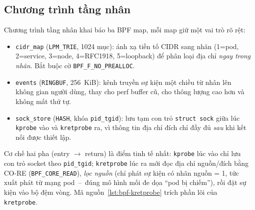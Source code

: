 \subsection{Chương trình tầng nhân}
\label{subsec:impl-kern}

Chương trình tầng nhân khai báo ba BPF map, mỗi map giữ một vai trò rõ rệt:

\begin{itemize}[leftmargin=1.4em]
  \item \texttt{cidr\_map} (\texttt{LPM\_TRIE}, 1024 mục): ánh xạ tiền tố CIDR sang
        nhãn (1=pod, 2=service, 3=node, 4=RFC1918, 5=loopback) để phân loại địa chỉ
        \emph{ngay trong nhân}. Bắt buộc cờ \texttt{BPF\_F\_NO\_PREALLOC}.
  \item \texttt{events} (\texttt{RINGBUF}, 256~KiB): kênh truyền sự kiện một chiều
        từ nhân lên không gian người dùng, thay cho perf buffer cũ, cho thông lượng
        cao hơn và không mất thứ tự.
  \item \texttt{sock\_store} (\texttt{HASH}, khóa \texttt{pid\_tgid}): lưu tạm con
        trỏ \texttt{struct sock} giữa lúc \texttt{kprobe} vào và \texttt{kretprobe}
        ra, vì thông tin địa chỉ đích chỉ đầy đủ \emph{sau} khi kết nối được thiết lập.
\end{itemize}

Cơ chế hai pha (entry $\rightarrow$ return) là điểm tinh tế nhất: \texttt{kprobe} lúc
vào chỉ lưu con trỏ socket theo \texttt{pid\_tgid}; \texttt{kretprobe} lúc ra mới đọc
địa chỉ nguồn/đích bằng CO-RE (\texttt{BPF\_CORE\_READ}), \emph{lọc nguồn} (chỉ phát
sự kiện có nhãn nguồn = 1, tức xuất phát từ mạng pod~--~đúng mô hình mối đe dọa
``pod bị chiếm''), rồi đặt sự kiện vào bộ đệm vòng. Mã
nguồn~\ref{lst:bpf-kretprobe} trích phần lõi của \texttt{kretprobe}.

